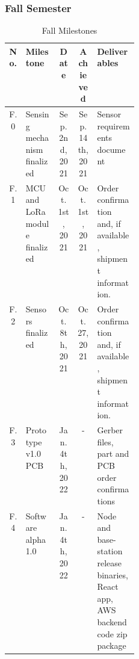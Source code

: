 \subsubsection{Fall Semester}
\begin{table}[H]
    \footnotesize  
    \caption{Fall Milestones}
    \label{tab:fall-milestones}

    \begin{tabularx}{\linewidth}{| c | p{0.25\linewidth} | c | c | X |}
      \hline
      No. & Milestone & Date & Achieved & Deliverables 
      \\\hline\hline

      F.0 
      & Sensing mechanism finalized 
      & Sep. 2nd, 2021 
      & Sep. 14th, 2021
      & Sensor requirements document 
      \\\hline

      F.1 
      & MCU and LoRa module finalized
      & Oct. 1st, 2021 
      & Oct. 1st, 2021 
      & Order confirmation and, if available, shipment information. 
      \\\hline

      F.2 
      & Sensors finalized 
      & Oct. 8th, 2021 
      & Oct. 27, 2021
      & Order confirmation and, if available, shipment information. 
      \\\hline

      F.3 
      & Prototype v1.0 PCB 
      & Jan. 4th, 2022 
      & -
      & Gerber files, part and PCB order confirmations
      \\\hline

      F.4 
      & Software alpha 1.0 
      & Jan. 4th, 2022 
      & -
      & Node and base-station release binaries, React app, AWS backend code zip package 
      \\\hline

    \end{tabularx}
\end{table}

